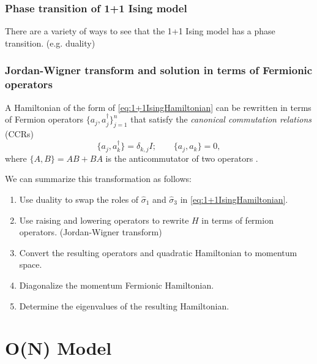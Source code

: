 \documentclass[10pt,reqno]{amsart}
\begin{document}
    \subsubsection{Phase transition of 1+1 Ising model}
    
    There are a variety of ways to see that the 1+1 Ising model has a phase transition.
    (e.g. duality) \cite{KogutGaugeSummary}
    
    \subsubsection{Jordan-Wigner transform and solution in terms of Fermionic operators}
    
    A Hamiltonian of the form of \cref{eq:1+1IsingHamiltonian} can be rewritten in terms of Fermion operators $\{a_j,a^\dagger_j\}_{j=1}^n$ that satisfy the \emph{canonical commutation relations} (CCRs) 
    \[ \{a_j,a_k^\dagger \} = \delta_{k,j}I; \qquad \{a_j,a_k \} =0, \]
    where $\{A,B\} = AB + BA$ is the anticommutator of two operators \cite{KogutGaugeSummary,nielsen_fermions,SchultzMattisLieb64}.
    
    We can summarize this transformation as follows:
    \begin{enumerate}
    	\item Use duality to swap the roles of $\hat{\sigma}_1$ and $\hat{\sigma}_3$ in \cref{eq:1+1IsingHamiltonian}.
    	\item Use raising and lowering operators to rewrite $H$ in terms of fermion operators. (Jordan-Wigner transform)
    	\item Convert the resulting operators and quadratic Hamiltonian to momentum space.
    	\item Diagonalize the momentum Fermionic Hamiltonian.
    	\item Determine the eigenvalues of the resulting Hamiltonian.
    \end{enumerate}
	
	\section{O(N) Model}
	
\end{document}
